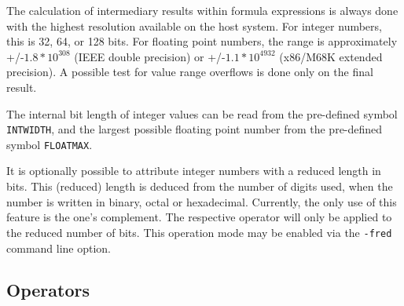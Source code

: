 \documentclass[12pt,twoside]{report}
\newcommand{\tty}[1]{{\tt #1}}
\begin{document}
The calculation of intermediary results within formula expressions is
always done with the highest resolution available on the host system.
For integer numbers, this is 32, 64, or 128 bits.  For floating point numbers,
the range is approximately +/-$1.8*10^{308}$ (IEEE double precision) or
+/-$1.1*10^{4932}$ (x86/M68K extended precision). A possible test for value
range overflows is done only on the final result.

The internal bit length of integer values can be read from the pre-defined
symbol \tty{INTWIDTH}, and the largest possible floating point number
from the pre-defined symbol \tty{FLOATMAX}.

It is optionally possible to attribute integer numbers with a reduced
length in bits.  This (reduced) length is deduced from the number of
digits used, when the number is written in binary, octal or hexadecimal.
Currently, the only use of this feature is the one's complement.  The
respective operator will only be applied to the reduced number of bits.
This operation mode may be enabled via the \tty{-fred} command line option.

\subsection{Operators}
\end{document}
